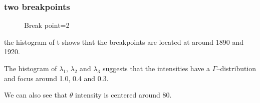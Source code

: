 \documentclass{article}
\begin{document}
\subsubsection{two breakpoints}
\begin{figure}[H]
    \centering
    \caption{Break point=2}
\end{figure}

the histogram of t shows that the breakpoints are located at around 1890 and 1920.

The histogram of $\lambda_1$, $\lambda_2$ and $\lambda_3$ suggests that the intensities have a $\Gamma$–distribution and focus around 1.0, 0.4 and 0.3.

We can also see that $\theta$ intensity is centered around 80.
\end{document}

